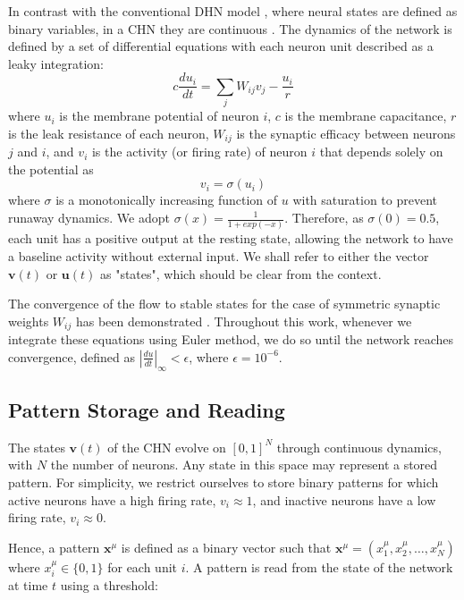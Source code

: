 \documentclass[10pt,letterpaper]{article}
\begin{document}
In contrast with the conventional DHN model \cite{hopfield_neural_1982},
where neural states are defined as binary variables, in a CHN they are continuous  \cite{hopfield_neurons_1984}.
The dynamics of the network is defined by a set of
differential equations with each neuron unit described as a leaky integration:
\begin{equation}
\label{eq:CHN}
c\frac{du_i}{dt} = \sum_j W_{ij}v_j - \frac{u_i}{r}
\end{equation}
where $u_i$ is the membrane potential of neuron $i$, $c$ is the membrane capacitance, $r$ is the leak resistance of each neuron, $W_{ij}$ is the synaptic efficacy between neurons $j$ and $i$, and $v_i$ is the activity (or firing rate) of neuron $i$ that depends solely on the potential as
\[
v_i = \sigma(u_i)
\]
where $\sigma$ is a monotonically increasing function of $u$ with saturation to prevent runaway dynamics. 
We adopt $\sigma(x) = \frac{1}{1 + exp(-x)}$. Therefore, as $\sigma(0) = 0.5$, each unit has a positive output at the resting state, allowing the network to have a baseline activity without external input. 
We shall refer to either the vector $\mathbf{v}(t)$ or $\mathbf{u}(t)$ as "states", which should be clear from the context.

The convergence of the flow to stable states
for the case of symmetric synaptic weights $W_{ij}$ has been demonstrated \cite{hopfield_neurons_1984}. 
Throughout this work, whenever we integrate these equations using Euler method, we do so until 
the network reaches convergence, defined as $|\frac{du}{dt}|_{\infty} < \epsilon$, where $\epsilon = 10^{-6}$.

\subsection{Pattern Storage and Reading}
\label{sec:pattern_storage_reading}
The states $\textbf{v}(t)$ of the CHN evolve on $[0,1]^N$ through continuous dynamics, with $N$ the number of neurons. Any state in this space may represent a stored pattern. 
For simplicity, we restrict ourselves to store binary patterns for which active neurons have a high firing rate, $v_i \approx 1$, and inactive neurons have a low firing rate, $v_i \approx 0$. 

Hence, a pattern $\mathbf{x}^\mu$ is defined as a binary vector such that \( \mathbf{x}^\mu = (x^\mu_1, x^\mu_2, \ldots, x^\mu_N) \) where \( x^\mu_i \in \{0, 1\} \) for each unit \( i \). A pattern is read from the state of the network at time $t$ using a threshold:
\end{document}
